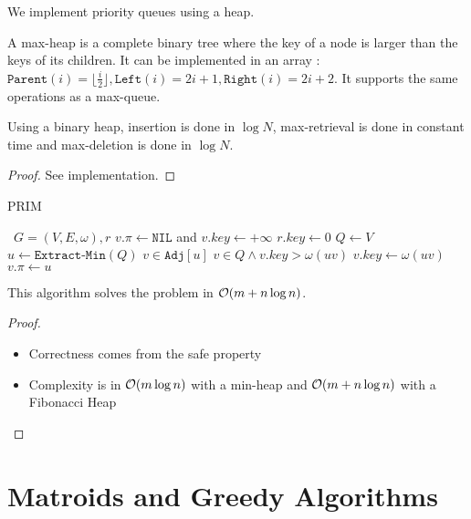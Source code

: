 \documentclass{cours}
\begin{document}
We implement priority queues using a heap.
\begin{definition}
    A max-heap is a complete binary tree where the key of a node is larger than the keys of its children. It can be implemented in an array : $\texttt{Parent}(i) = \lfloor \frac{i}{2}\rfloor, \texttt{Left}(i) = 2 i + 1, \texttt{Right}(i) = 2i + 2$. It supports the same operations as a max-queue.
\end{definition}

\begin{theorem}
    Using a binary heap, insertion is done in $\log N$, max-retrieval is done in constant time and max-deletion is done in $\log N$.
\end{theorem}
\begin{proof}
    See implementation.
\end{proof}

\begin{algorithm}
    \caption{PRIM}
    \begin{algorithmic}
        \Input \ $G = \left(V, E, \omega\right), r$
        \EndInput
        \State $v.\pi \gets \texttt{NIL}$ and $v.key \gets + \infty$
        \EndFor
        \State $r.key \gets 0$
        \State $Q \gets V$
        \State $u \gets \texttt{Extract-Min}(Q)$
        \For $v \in \texttt{Adj}[u]$
        \If $v \in Q \wedge v.key > \omega(uv)$
        \State $v.key \gets \omega(uv)$
        \State $v.\pi \gets u$
        \EndIf
        \EndFor
        \EndWhile
    \end{algorithmic}
\end{algorithm}

\begin{theorem}
    This algorithm solves the problem in $\mathcal{O}(m + n\log n)$.
\end{theorem}

\begin{proof}
    \begin{itemize}
        \item Correctness comes from the safe property
        \item Complexity is in $\mathcal{O}(m\log n)$ with a min-heap and $\mathcal{O}(m + n\log n)$ with a Fibonacci Heap
    \end{itemize}
\end{proof}

\section{Matroids and Greedy Algorithms}
\end{document}
